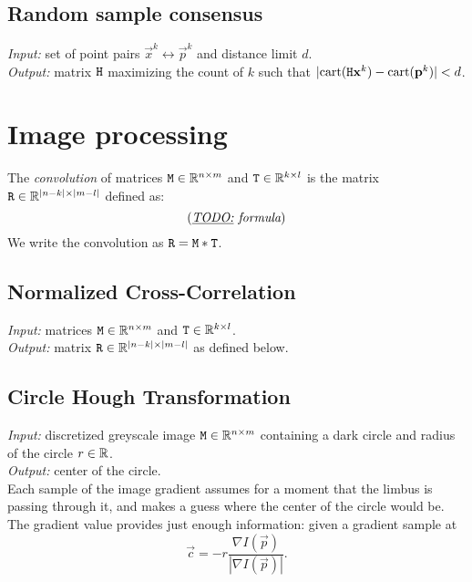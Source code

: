 \subsection{Random sample consensus}

\textit{Input:} set of point pairs $\vec x^k \leftrightarrow \vec p^k$ and distance limit $d$.\\
\textit{Output:} matrix $\mathtt{H}$ maximizing the count of $k$ such that $|\mathrm{cart}(\mathtt{H} \mathbf{x}^k) - \mathrm{cart}(\mathbf{p}^k)| < d$.\\

\cite[p.117]{hartley03}

\section{Image processing}

\begin{definition}
The \textit{convolution} of matrices $\mathtt{M} \in \mathbb{R}^{n \times m}$ and $\mathtt{T} \in \mathbb{R}^{k \times l}$ is the matrix $\mathtt{R} \in \mathbb{R}^{|n-k| \times |m - l|}$ defined as:
$$(\textit{\underline{TODO:} formula})
$$
We write the convolution as $\mathtt{R} = \mathtt{M} \ast \mathtt{T}$.
\end{definition}

\subsection{Normalized Cross-Correlation}

\textit{Input:} matrices $\mathtt{M} \in \mathbb{R}^{n \times m}$ and $\mathtt{T} \in \mathbb{R}^{k \times l}$.\\
\textit{Output:} matrix $\mathtt{R} \in \mathbb{R}^{|n-k| \times |m - l|}$ as defined below.\\


\subsection{Circle Hough Transformation}
\label{s:algo-hough}

\textit{Input:} discretized greyscale image $\mathtt{M} \in \mathbb{R}^{n \times m}$ containing a dark circle and radius of the circle $r \in \mathbb{R}$.\\
\textit{Output:} center of the circle.\\

Each sample of the image gradient assumes for a moment that the limbus is passing through it, and makes a guess where the center of the circle would be.
The gradient value provides just enough information: given a gradient sample at 
$$\vec c = -r \frac {\nabla I(\vec p)} {|\nabla I(\vec p)|}.$$

